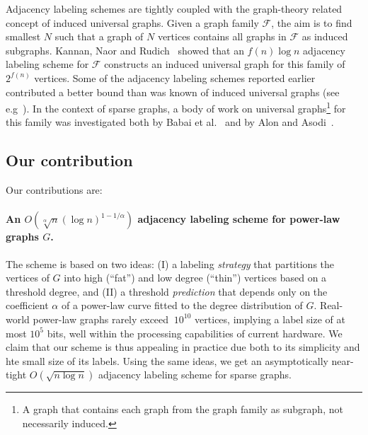 Adjacency labeling schemes are tightly coupled with  the graph-theory related concept of induced universal graphs.
Given a  graph family  $\mathcal{F}$, the aim  is to find smallest $N$ such that a graph of  $N$ vertices contains all graphs in $\mathcal{F}$ as induced subgraphs. 
Kannan, Naor and Rudich~\cite{Kannan92} showed that an $f(n) \log n$ adjacency labeling scheme for $\mathcal{F}$  constructs an induced universal graph for this family of  $2^{f(n)}$ vertices. Some  of the adjacency labeling schemes reported earlier  contributed a better bound than was known of  induced universal graphs (see e.g~\cite{BCLR,Alstrup02}).
In the context of  sparse graphs,  a body of work on universal graphs\footnote{A graph that  contains each graph from the graph family as subgraph, not necessarily induced.} for this family was  investigated both by  Babai et al.~\cite{babai1982graphs} and  by Alon and Asodi~\cite{Alon2002universal}. 


\subsection{Our contribution}

Our contributions are:

\paragraph{An  $O(\sqrt[\alpha] n (\log n)^{1 - 1/\alpha})$ adjacency labeling scheme for power-law graphs $G$.}
The scheme is based on two ideas:
(I) a labeling \emph{strategy} that  partitions the vertices of $G$ into high (``fat'') and low degree (``thin'') vertices based on a threshold degree, and (II) a threshold \emph{prediction} that depends only on the coefficient $\alpha$ of a power-law curve fitted to the degree distribution of $G$. 
Real-world power-law graphs rarely exceed  $~10^{10}$ vertices, implying a label size of at most  ${10^{5}}$ bits, well within the processing capabilities of current hardware. 
We claim that our  scheme is thus appealing in practice   due both to  its simplicity and hte small size of its labels.
Using the same ideas, we get an  asymptotically near-tight  $O(\sqrt{n \log n})$ adjacency labeling scheme for sparse graphs.

